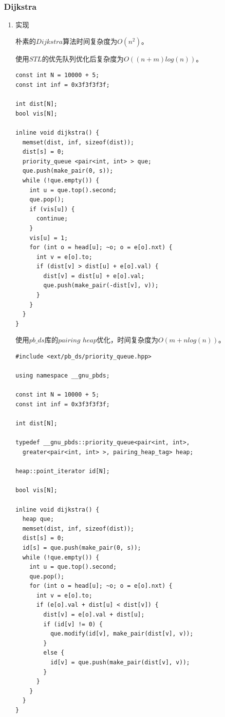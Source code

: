 \documentclass[11pt]{article}
\begin{document}
\subsubsection{Dijkstra}
\label{sec-2-6-1}
\begin{enumerate}
\item 实现
\label{sec-2-6-1-1}

朴素的\(Dijkstra\)算法时间复杂度为\(O(n^2)\)。

使用\(STL\)的优先队列优化后复杂度为\(O((n+m)log(n))\)。

\begin{verbatim}
const int N = 10000 + 5;
const int inf = 0x3f3f3f3f;

int dist[N];
bool vis[N];

inline void dijkstra() {
  memset(dist, inf, sizeof(dist));
  dist[s] = 0;
  priority_queue <pair<int, int> > que;
  que.push(make_pair(0, s));
  while (!que.empty()) {
    int u = que.top().second;
    que.pop();
    if (vis[u]) {
      continue;
    }
    vis[u] = 1;
    for (int o = head[u]; ~o; o = e[o].nxt) {
      int v = e[o].to;
      if (dist[v] > dist[u] + e[o].val) {
        dist[v] = dist[u] + e[o].val;
        que.push(make_pair(-dist[v], v));
      }
    }
  }
}
\end{verbatim}


使用\(pb\_ds\)库的\(pairing\) \(heap\)优化，时间复杂度为\(O(m+nlog(n))\)。

\begin{verbatim}
#include <ext/pb_ds/priority_queue.hpp>

using namespace __gnu_pbds;

const int N = 10000 + 5;
const int inf = 0x3f3f3f3f;

int dist[N];

typedef __gnu_pbds::priority_queue<pair<int, int>, 
  greater<pair<int, int> >, pairing_heap_tag> heap;

heap::point_iterator id[N];

bool vis[N];

inline void dijkstra() {
  heap que;
  memset(dist, inf, sizeof(dist));
  dist[s] = 0;
  id[s] = que.push(make_pair(0, s));
  while (!que.empty()) {
    int u = que.top().second;
    que.pop();
    for (int o = head[u]; ~o; o = e[o].nxt) {
      int v = e[o].to;
      if (e[o].val + dist[u] < dist[v]) {
        dist[v] = e[o].val + dist[u];
        if (id[v] != 0) {
          que.modify(id[v], make_pair(dist[v], v));
        }
        else {
          id[v] = que.push(make_pair(dist[v], v));
        }
      }
    }
  }
}
\end{verbatim}
\end{enumerate}
\end{document}
